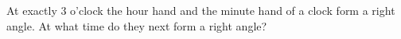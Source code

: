 At exactly $3$ o'clock the hour hand and the minute hand of a clock form a right angle. At what time do they next form a right angle?
